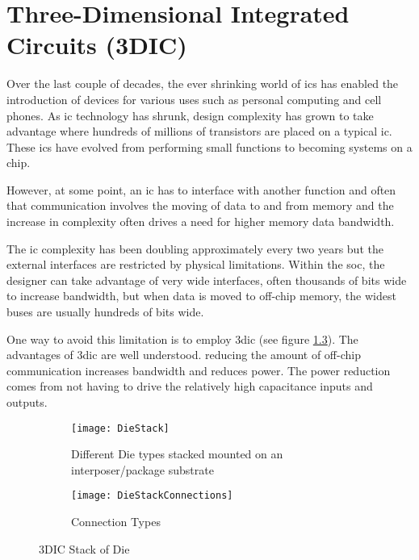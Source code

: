 

\chapter{Three-Dimensional Integrated Circuits (3DIC)}
\label{sec:3dic}

Over the last couple of decades, the ever shrinking world of \acp{ic} has enabled the introduction of devices for various uses such as personal computing and cell phones.
As \ac{ic} technology has shrunk, design complexity has grown to take advantage where hundreds of millions of transistors are placed on a typical \ac{ic}.
These \acp{ic} have evolved from performing small functions to becoming systems on a chip.

However, at some point, an \ac{ic} has to interface with another function and often that communication involves the moving of data to and from memory and the increase in complexity often drives a need for higher memory data bandwidth. 

The \ac{ic} complexity has been doubling approximately every two years but the external interfaces are restricted by physical limitations.
Within the \ac{soc}, the designer can take advantage of very wide interfaces, often thousands of bits wide to increase bandwidth, but when data is moved to off-chip memory, the widest buses are usually hundreds of bits wide.

One way to avoid this limitation is to employ \ac{3dic} (see figure \ref{fig:3DIC Die}). The advantages of \ac{3dic} are well understood. reducing the amount of off-chip communication increases bandwidth and reduces power. The power reduction comes from not having to drive the relatively
high capacitance inputs and outputs.

\begin{figure}
\centering
\begin{subfigure}{.8\textwidth}
  \centering
  \texttt{[image: DieStack]}
  \captionsetup{justification=centering, skip=5pt}
  \caption{Different Die types stacked mounted on an interposer/package substrate}
  \label{fig:Die Stack}
\end{subfigure}%

\bigskip

\begin{subfigure}{.8\textwidth}
  \centering
  \texttt{[image: DieStackConnections]}
  \captionsetup{justification=centering, skip=5pt}
  \caption{Connection Types}
  \label{fig:Die Stack Connection Types}
\end{subfigure}
\captionsetup{justification=centering, skip=12pt}
\caption[3DIC Stack of Die]{3DIC Stack of Die}
\label{fig:3DIC Die}
\end{figure}

